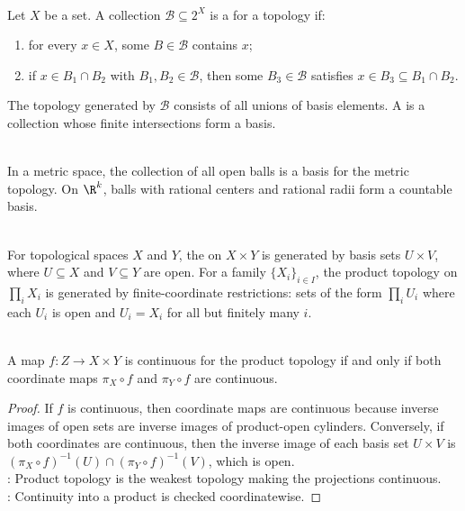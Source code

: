 \begin{definition} \label{def:basis-for-topology} \\
Let $X$ be a set. A collection $\mathcal{B}\subseteq 2^X$ is a  for a topology if:
\begin{enumerate}[label=(\roman*)]
\setlength{\itemsep}{0pt}
\item for every $x\in X$, some $B\in\mathcal{B}$ contains $x$;
\item if $x\in B_1\cap B_2$ with $B_1,B_2\in\mathcal{B}$, then some $B_3\in\mathcal{B}$ satisfies $x\in B_3\subseteq B_1\cap B_2$.
\end{enumerate}
The topology generated by $\mathcal{B}$ consists of all unions of basis elements. A  is a collection whose finite intersections form a basis.
\end{definition}

\begin{example} \label{ex:metric-balls-basis} \\
In a metric space, the collection of all open balls is a basis for the metric topology. On $\R^k$, balls with rational centers and rational radii form a countable basis.
\end{example}

\begin{definition} \label{def:product-topology} \\
For topological spaces $X$ and $Y$, the  on $X\times Y$ is generated by basis sets $U\times V$, where $U\subseteq X$ and $V\subseteq Y$ are open. For a family $\{X_i\}_{i\in I}$, the product topology on $\prod_iX_i$ is generated by finite-coordinate restrictions: sets of the form $\prod_iU_i$ where each $U_i$ is open and $U_i=X_i$ for all but finitely many $i$.
\end{definition}

\begin{proposition} \label{prop:product-topology-coordinate-continuity} \\
A map $f:Z\to X\times Y$ is continuous for the product topology if and only if both coordinate maps $\pi_X\circ f$ and $\pi_Y\circ f$ are continuous.
\begin{proof}
If $f$ is continuous, then coordinate maps are continuous because inverse images of open sets are inverse images of product-open cylinders. Conversely, if both coordinates are continuous, then the inverse image of each basis set $U\times V$ is $(\pi_X\circ f)^{-1}(U)\cap(\pi_Y\circ f)^{-1}(V)$, which is open.\\
: Product topology is the weakest topology making the projections continuous.\\
: Continuity into a product is checked coordinatewise.
\end{proof}
\end{proposition}

